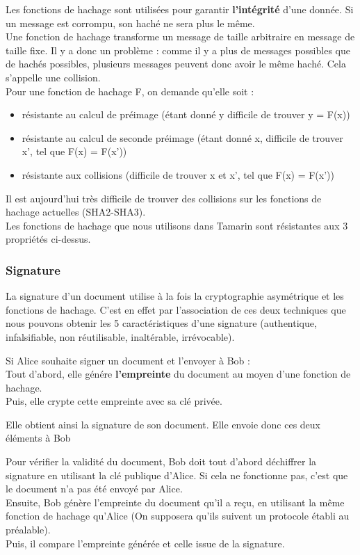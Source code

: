 \documentclass[conference]{IEEEtran}
\begin{document}
Les fonctions de hachage sont utilisées pour garantir \textbf{l'intégrité} d'une donnée. Si un message est corrompu, son haché ne sera plus le même. \cite{igmsign}\\
Une fonction de hachage transforme un message de taille arbitraire en message de taille fixe. Il y a donc un problème : comme il y a plus de messages possibles que de hachés possibles, plusieurs messages peuvent donc avoir le même haché. Cela s'appelle une collision. \cite{ryxhash, cryptohash}\\
Pour une fonction de hachage F, on demande qu'elle soit :
\begin{itemize}
    \item résistante au calcul de préimage (étant donné y difficile de trouver y = F(x))
    \item résistante au calcul de seconde préimage (étant donné x, difficile de trouver x', tel que F(x) = F(x'))
    \item résistante aux collisions (difficile de trouver x et x', tel que F(x) = F(x'))
\end{itemize}
\vspace{0.2cm}
Il est aujourd'hui très difficile de trouver des collisions sur les fonctions de hachage actuelles (SHA2-SHA3). \\
Les fonctions de hachage que nous utilisons dans Tamarin sont résistantes aux 3 propriétés ci-dessus. \\

\subsubsection{Signature}
La signature d'un document utilise à la fois la cryptographie asymétrique et les fonctions de hachage. C'est en effet par l'association de ces deux techniques que nous pouvons obtenir les 5 caractéristiques d'une signature (authentique, infalsifiable, non réutilisable, inaltérable, irrévocable). \cite{igmsign}

Si Alice souhaite signer un document et l'envoyer à Bob : \\
    Tout d'abord, elle génére \textbf{l'empreinte} du document au moyen d'une fonction de hachage.\\
    Puis, elle crypte cette empreinte avec sa clé privée.

    Elle obtient ainsi la signature de son document. Elle envoie donc ces deux éléments à Bob

    Pour vérifier la validité du document, Bob doit tout d'abord déchiffrer la signature en utilisant la clé publique d'Alice. Si cela ne fonctionne pas, c'est que le document n'a pas été envoyé par Alice.\\
    Ensuite, Bob génère l'empreinte du document qu'il a reçu, en utilisant la même fonction de hachage qu'Alice (On supposera qu'ils suivent un protocole établi au préalable).\\
    Puis, il compare l'empreinte générée et celle issue de la signature.
\end{document}
